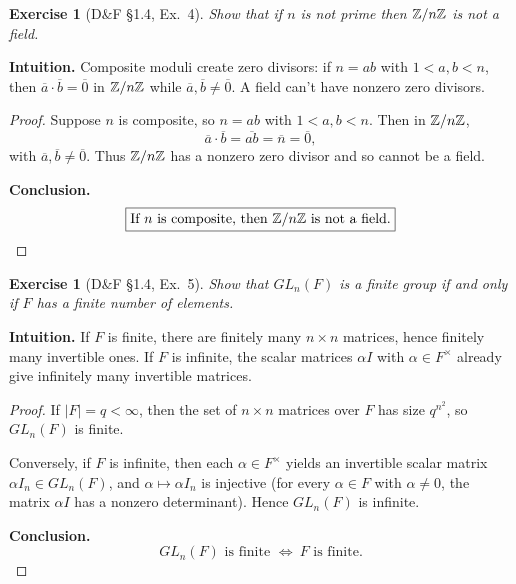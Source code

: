 \documentclass[12pt]{article}
\newtheorem{exercise}[theorem]{Exercise}
\theoremstyle{definition}
\begin{document}
\newpage

\begin{exercise}[D\&F §1.4, Ex.~4]
Show that if $n$ is not prime then $\Bbb Z/n\Bbb Z$ is not a field.
\end{exercise}

\dotfill

\noindent\textbf{Intuition.}
Composite moduli create zero divisors: if $n=ab$ with $1<a,b<n$, then $\overline a\cdot\overline b=\overline 0$ in $\Bbb Z/n\Bbb Z$ while $\overline a,\overline b\ne\overline 0$. A field can’t have nonzero zero divisors.

\dotfill

\begin{proof}
Suppose $n$ is composite, so $n=ab$ with $1<a,b<n$. Then in $\Bbb Z/n\Bbb Z$,
\[
\overline a\cdot \overline b=\overline{ab}=\overline n=\overline 0,
\]
with $\overline a,\overline b\ne\overline 0$. Thus $\Bbb Z/n\Bbb Z$ has a nonzero zero divisor and so cannot be a field.
\smallskip

\noindent\textbf{Conclusion.}
\[
\boxed{\text{If }n\text{ is composite, then }\Bbb Z/n\Bbb Z\text{ is not a field.}}
\]
\end{proof}

\newpage

\begin{exercise}[D\&F §1.4, Ex.~5]
Show that $GL_n(F)$ is a finite group if and only if $F$ has a finite number of elements.
\end{exercise}

\dotfill

\noindent\textbf{Intuition.}
If $F$ is finite, there are finitely many $n\times n$ matrices, hence finitely many invertible ones. If $F$ is infinite, the scalar matrices $\alpha I$ with $\alpha\in F^\times$ already give infinitely many invertible matrices.

\dotfill

\begin{proof}
If $|F|=q<\infty$, then the set of $n\times n$ matrices over $F$ has size $q^{n^2}$, so $GL_n(F)$ is finite.

Conversely, if $F$ is infinite, then each $\alpha\in F^\times$ yields an invertible scalar matrix $\alpha I_n\in GL_n(F)$, and $\alpha\mapsto \alpha I_n$ is injective (for every $\alpha \in F$ with $\alpha \neq 0$, the matrix $\alpha I$ has a nonzero determinant). Hence $GL_n(F)$ is infinite.
\smallskip

\noindent\textbf{Conclusion.}
\[
\boxed{GL_n(F)\text{ is finite }\Longleftrightarrow\ F\text{ is finite}.}
\]
\end{proof}
\end{document}

